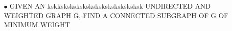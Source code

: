 \documentclass[preview]{standalone}
\begin{document}
\begin{center}
$\bullet$ GIVEN   AN  kskksksksksksksksksksksksksksk UNDIRECTED   AND   WEIGHTED   GRAPH   G,   FIND   A   CONNECTED   SUBGRAPH   OF   G   OF   MINIMUM   WEIGHT
\end{center}
\end{document}
